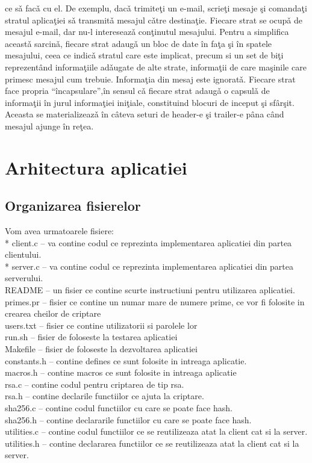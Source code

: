 \documentclass[runningheads]{llncs}
\begin{document}
ce sǎ facǎ cu el. De exemplu, dacǎ trimiteţi un e-mail, scrieţi mesaje şi comandaţi stratul
aplicaţiei sǎ transmitǎ mesajul cǎtre destinaţie. Fiecare strat se ocupǎ de mesajul e-mail,
dar nu-l intereseazǎ conţinutul mesajului.
 Pentru a simplifica aceastǎ sarcinǎ, fiecare strat adaugǎ un bloc de date în faţa şi
în spatele mesajului, ceea ce indicǎ stratul care este implicat, precum si un set de biţi
reprezentând informaţiile adǎugate de alte strate, informaţii de care maşinile care primesc 
mesajul cum trebuie. Informaţia din mesaj este ignoratǎ. Fiecare strat face propria
“încapsulare”,în sensul cǎ fiecare strat adaugǎ o capsulǎ de informaţii în jurul informaţiei
iniţiale, constituind blocuri de inceput şi sfârşit. Aceasta se materializeazǎ în câteva seturi
de header-e şi trailer-e pâna când mesajul ajunge în reţea. \cite{ref_tcp1}



\section{Arhitectura aplicatiei}
\subsection{Organizarea fisierelor}
Vom avea urmatoarele fisiere:\\
* client.c -- va contine codul ce reprezinta implementarea aplicatiei din partea clientului.  \\
* server.c  -- va contine codul ce reprezinta implementarea aplicatiei din partea serverului.  \\
README  -- un fisier ce contine scurte instructiuni pentru utilizarea aplicatiei.\\
primes.pr  -- fisier ce contine un numar mare de numere prime, ce vor fi folosite in crearea cheilor de criptare\\
users.txt -- fisier ce contine utilizatorii si parolele lor\\
run.sh  -- fisier de foloseste la testarea aplicatiei\\
Makefile    -- fisier de foloseste la dezvoltarea aplicatiei\\
constants.h  -- contine defines ce sunt folosite in intreaga aplicatie.\\
macros.h  --  contine macros ce sunt folosite in intreaga aplicatie\\
rsa.c  --  contine codul pentru criptarea de tip rsa.\\
rsa.h   --  contine declarile functiilor ce ajuta la criptare.\\
sha256.c  -- contine codul functiilor cu care se poate face hash.\\
sha256.h  -- contine declararile functiilor cu care se poate face hash.\\
utilities.c  -- contine codul functiilor ce se reutilizeaza atat la client cat si la server.\\
utilities.h -- contine declararea functiilor ce se reutilizeaza atat la client cat si la server.\\
\end{document}
